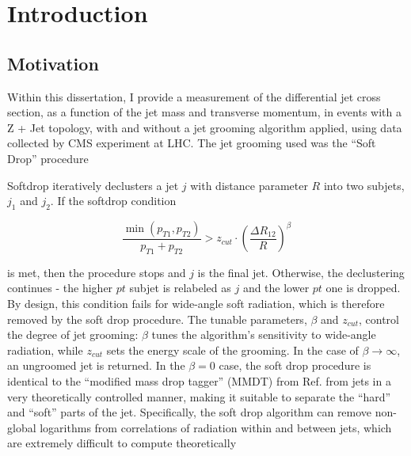 \chapter{Introduction}\label{chap:intro}

\section{Motivation}\label{sec:ch1:intro}

Within this dissertation, I provide a measurement of the differential jet cross section, as a function of the jet mass and transverse momentum, in events with a Z + Jet topology, with and without a jet grooming algorithm applied, using data collected by CMS experiment at LHC. The jet grooming used was the ``Soft Drop''
procedure 

Softdrop iteratively declusters a jet $j$ with distance parameter $R$ into two subjets, $j_1$ and $j_2$.
If the softdrop condition

\begin{equation}
  \frac{\min(p_{T1},p_{T2})}{p_{T1}+p_{T2}} > z_{cut} \cdot (\frac{\Delta R_{12}}{R})^\beta
\end{equation}

is met, then the procedure stops and $j$ is the final jet. Otherwise, the declustering continues - 
the higher $pt$ subjet is relabeled as $j$ and the lower $pt$ one is dropped.
By design, this condition fails for wide-angle soft radiation, which is therefore removed by the soft
drop procedure. The tunable parameters, $\beta$ and $z_{cut}$, control the degree of jet grooming:
$\beta$ tunes the algorithm's sensitivity to wide-angle radiation, while $z_{cut}$ sets the energy scale
of the grooming. In the case of $\beta \rightarrow \infty$, an ungroomed jet is returned. 
In the $\beta = 0$ case, the soft drop procedure is identical to the ``modified mass drop tagger'' (MMDT)
from Ref.
from jets in a very theoretically controlled manner, making it suitable to separate
the ``hard'' and ``soft'' parts of the jet. Specifically, the soft drop
algorithm can remove non-global logarithms from correlations of
radiation within and between jets, which are extremely difficult to
compute theoretically


